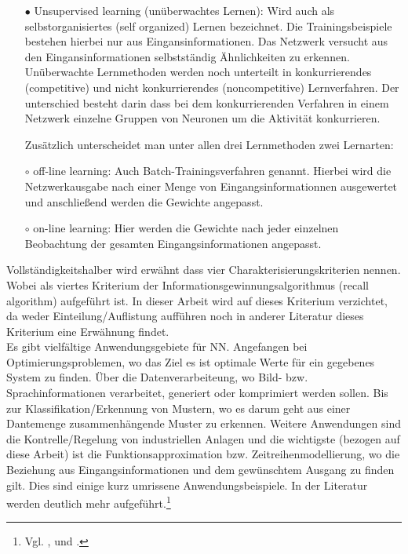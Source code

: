 \begin{enumerate}
\begin{itemize}
\item[\textbf{$\bullet$}]%
Unsupervised learning (unüberwachtes Lernen): Wird auch als selbstorganisiertes (self organized) Lernen bezeichnet. Die Trainingsbeispiele bestehen hierbei nur aus Eingansinformationen. Das Netzwerk versucht aus den Eingansinformationen selbstständig Ähnlichkeiten zu erkennen.
Unüberwachte Lernmethoden werden noch unterteilt in konkurrierendes (competitive) und nicht konkurrierendes (noncompetitive) Lernverfahren. Der unterschied besteht darin dass bei dem konkurrierenden Verfahren in einem Netzwerk einzelne Gruppen von Neuronen um die Aktivität konkurrieren.

Zusätzlich unterscheidet man unter allen drei Lernmethoden zwei Lernarten: 
\item[$\circ$]%
off-line learning: Auch Batch-Trainingsverfahren genannt. Hierbei wird die Netzwerkausgabe nach einer Menge von Eingangsinformationnen ausgewertet und anschließend werden die Gewichte angepasst.

\item[$\circ$]%
on-line learning: Hier werden die Gewichte nach jeder einzelnen Beobachtung der gesamten Eingangsinformationen angepasst. 

\end{itemize}

\end{enumerate}

Vollständigkeitshalber wird erwähnt dass \citet{characterisation_4} vier Charakterisierungskriterien nennen. Wobei als viertes Kriterium der Informationsgewinnungsalgorithmus (recall algorithm) aufgeführt ist. In dieser Arbeit wird auf dieses Kriterium verzichtet, da weder \citet{characterisation_4} Einteilung/Auflistung aufführen noch in anderer Literatur dieses Kriterium eine Erwähnung findet.\\

Es gibt vielfältige Anwendungsgebiete für NN. Angefangen bei Optimierungsproblemen, wo das Ziel es ist optimale Werte für ein gegebenes System zu finden. Über die Datenverarbeiteung, wo Bild- bzw. Sprachinformationen verarbeitet, generiert oder komprimiert werden sollen. Bis zur Klassifikation/Erkennung von Mustern, wo es darum geht aus einer Dantemenge zusammenhängende Muster zu erkennen. Weitere Anwendungen sind die Kontrelle/Regelung von industriellen Anlagen und die wichtigste (bezogen auf diese Arbeit) ist die Funktionsapproximation bzw. Zeitreihenmodellierung, wo die Beziehung aus Eingangsinformationen und dem gewünschtem Ausgang zu finden gilt. Dies sind einige kurz umrissene Anwendungsbeispiele. In der Literatur werden deutlich mehr aufgeführt.\footnote{Vgl. \citet[224]{Kroll16}, \citet[15]{comp_int_07} und \citet[F1 ff]{Fiesler96}.}\\

